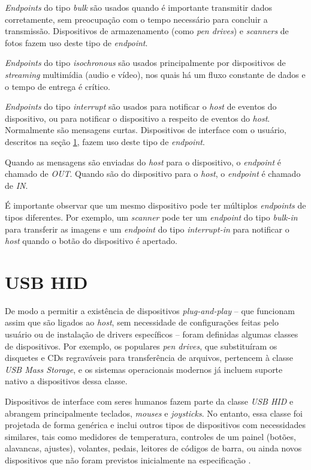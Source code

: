 \documentclass[brazil,pagestart=firstchapter]{abnt}
\begin{document}
\textit{Endpoints} do tipo \textit{bulk} são usados quando é importante
transmitir dados corretamente, sem preocupação com o tempo necessário para
concluir a transmissão. Dispositivos de armazenamento (como \textit{pen
drives}) e \textit{scanners} de fotos fazem uso deste tipo de
\textit{endpoint}.

\textit{Endpoints} do tipo \textit{isochronous} são usados principalmente
por dispositivos de \textit{streaming} multimídia (audio e vídeo), nos quais
há um fluxo constante de dados e o tempo de entrega é crítico.

\textit{Endpoints} do tipo \textit{interrupt} são usados para notificar o
\textit{host} de eventos do dispositivo, ou para notificar o dispositivo a
respeito de eventos do \textit{host}. Normalmente são mensagens curtas.
Dispositivos de interface com o usuário, descritos na seção
\ref{sec:usb_hid}, fazem uso deste tipo de \textit{endpoint}.

Quando as mensagens são enviadas do \textit{host} para o dispositivo, o
\textit{endpoint} é chamado de \textit{OUT}. Quando são do dispositivo para
o \textit{host}, o \textit{endpoint} é chamado de \textit{IN}.

É importante observar que um mesmo dispositivo pode ter múltiplos
\textit{endpoints} de tipos diferentes. Por exemplo, um \textit{scanner}
pode ter um \textit{endpoint} do tipo \textit{bulk-in} para transferir as
imagens e um \textit{endpoint} do tipo \textit{interrupt-in} para notificar
o \textit{host} quando o botão do dispositivo é apertado.


\section{USB HID}
\label{sec:usb_hid}

De modo a permitir a existência de dispositivos \textit{plug-and-play} --
que funcionam assim que são ligados ao \textit{host}, sem necessidade de
configurações feitas pelo usuário ou de instalação de drivers específicos --
foram definidas algumas classes de dispositivos. Por exemplo, os populares
\textit{pen drives}, que substituíram os disquetes e CDs regraváveis para
transferência de arquivos, pertencem à classe \textit{USB Mass Storage}, e
os sistemas operacionais modernos já incluem suporte nativo a dispositivos
dessa classe.

Dispositivos de interface com seres humanos fazem parte da classe
\textit{USB \acf{HID}} e abrangem principalmente teclados, \textit{mouses} e
\textit{joysticks}. No entanto, essa classe foi projetada de forma genérica
e inclui outros tipos de dispositivos com necessidades similares, tais como
medidores de temperatura, controles de um painel (botões, alavancas,
ajustes), volantes, pedais, leitores de códigos de barra, ou ainda novos
dispositivos que não foram previstos inicialmente na especificação
\cite{usbhid}.
\end{document}
